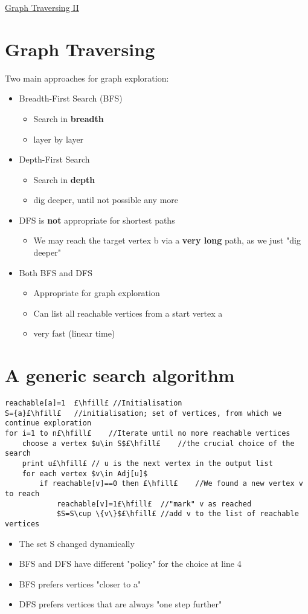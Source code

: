 \documentclass{article}[18pt]
\begin{document}
\begin{center}
\underline{\huge Graph Traversing II}
\end{center}
\section{Graph Traversing}
Two main approaches for graph exploration:
\begin{itemize}
	\item Breadth-First Search (BFS)
	\begin{itemize}
		\item Search in \textbf{breadth}
		\item layer by layer
	\end{itemize}
	\item Depth-First Search
	\begin{itemize}
		\item Search in \textbf{depth}
		\item dig deeper, until not possible any more
	\end{itemize}
\end{itemize}
\begin{itemize}
	\item DFS is \textbf{not} appropriate for shortest paths
	\begin{itemize}
		\item We may reach the target vertex b via a \textbf{very long} path, as we just "dig deeper"
	\end{itemize}
	\item Both BFS and DFS
	\begin{itemize}
		\item Appropriate for graph exploration
		\item Can list all reachable vertices from a start vertex a
		\item very fast (linear time)
	\end{itemize}
\end{itemize}
\section{A generic search algorithm}
\begin{lstlisting}[caption=Generic Graph Search]
reachable[a]=1	£\hfill£ //Initialisation
S={a}£\hfill£	//initialisation; set of vertices, from which we continue exploration
for i=1 to n£\hfill£	//Iterate until no more reachable vertices
	choose a vertex $u\in S$£\hfill£	//the crucial choice of the search
	print u£\hfill£	// u is the next vertex in the output list
	for each vertex $v\in Adj[u]$
		if reachable[v]==0 then £\hfill£	//We found a new vertex v to reach
			reachable[v]=1£\hfill£ 	//"mark" v as reached
			$S=S\cup \{v\}$£\hfill£	//add v to the list of reachable vertices
\end{lstlisting}
\begin{itemize}
	\item The set S changed dynamically
	\item BFS and DFS have different "policy" for the choice at line 4
	\item BFS prefers vertices "closer to a"
	\item DFS prefers vertices that are always "one step further"
\end{itemize}
\end{document}
